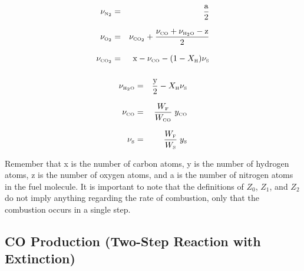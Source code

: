 \parbox{2.5in}{
\begin{eqnarray*}  \nu_{\tiny \hbox{N}_2}  &=& \frac{\hbox{a}}{2}\\*[.1in]
                  \nu_{\tiny \hbox{O}_2}  &=& \nu_{\tiny \hbox{CO}_2} + \frac{\nu_{\tiny \hbox{CO}}+\nu_{\tiny \hbox{H}_2\hbox{O}}-\hbox{z}}{2}\\*[.1in]
                  \nu_{\tiny \hbox{CO}_2} &=& \hbox{x} - \nu_{\tiny \hbox{CO}} - (1-X_{\tiny \hbox{H}}) \nu_{\tiny \hbox{S}}  \\*[.1in]
\end{eqnarray*} }
\hfill \parbox{3.5in}{\begin{eqnarray}
                  \nu_{\tiny \hbox{H}_2\hbox{O}} &=& \frac{\hbox{y}}{2}- X_{\tiny \hbox{H}} \nu_{\tiny \hbox{S}}\\*[.1in]
                  \nu_{\tiny \hbox{CO}}    &=& \frac{W_{\tiny \hbox{F}}}{W_{\tiny \hbox{CO}}} \; y_{\tiny \hbox{CO}} \\*[.1in]
                  \nu_{\tiny \hbox{S}}    &=& \frac{W_{\tiny \hbox{F}}}{W_{\tiny \hbox{S}}} \; y_{\tiny \hbox{S}}
\end{eqnarray} }
Remember that x is the number of carbon atoms, y is the number of hydrogen atoms, z is the number of oxygen atoms, and a is the number of nitrogen atoms in the fuel molecule.
It is important to note that the definitions of $Z_0$, $Z_1$, and $Z_2$ do not imply anything regarding the rate of combustion, only that the combustion occurs in a single step.


\subsection{CO Production (Two-Step Reaction with Extinction)}

\label{co_production}

